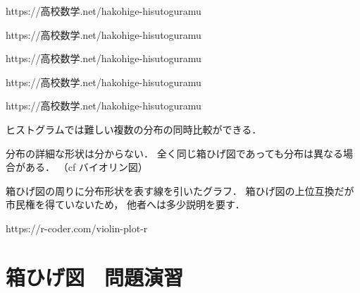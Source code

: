 {
  {https://高校数学.net/hakohige-hisutoguramu}
}

{
  {https://高校数学.net/hakohige-hisutoguramu}
}

{
  {https://高校数学.net/hakohige-hisutoguramu}
}

{
  {https://高校数学.net/hakohige-hisutoguramu}
}

{
  {https://高校数学.net/hakohige-hisutoguramu}
}

{
  ヒストグラムでは難しい複数の分布の同時比較ができる．
}

{
  分布の詳細な形状は分からない．
  全く同じ箱ひげ図であっても分布は異なる場合がある．
  （cf バイオリン図）
}

{
  箱ひげ図の周りに分布形状を表す線を引いたグラフ．
  箱ひげ図の上位互換だが市民権を得ていないため，
  他者へは多少説明を要す．\\[3mm]
  \begin{minipage}{0.45\textwidth}
  \end{minipage}
  \begin{minipage}{0.45\textwidth}
  \end{minipage}
  {https://r-coder.com/violin-plot-r}
}

\section{箱ひげ図　問題演習}

\MyFrame{\insertsection}
{
  \MyProblem
  {
  }
  \vspace{40mm}
}

\MyFrame{\insertsection}
{
  \MySolution
  {
  }
}

